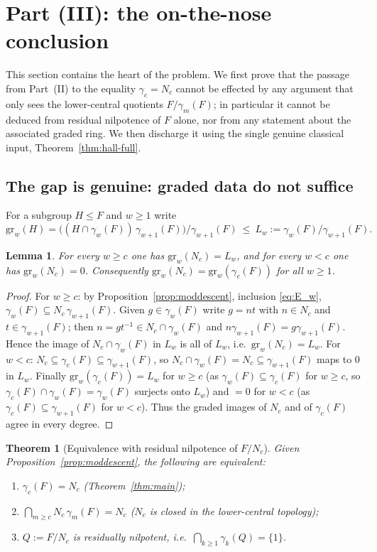 \documentclass{amsart}
\newtheorem{theorem}{Theorem}
\newtheorem{lemma}{Lemma}
\theoremstyle{definition}
\theoremstyle{remark}
\begin{document}
\section{Part (III): the on-the-nose conclusion}\label{sec:final}

This section contains the heart of the problem. We first prove that the passage
from Part~(II) to the equality $\gamma_c=N_c$ cannot be effected by any argument
that only sees the lower-central quotients $F/\gamma_m(F)$; in particular it cannot
be deduced from residual nilpotence of $F$ alone, nor from any statement about the
associated graded ring. We then discharge it using the single genuine classical
input, Theorem~\ref{thm:hall-full}.

\subsection{The gap is genuine: graded data do not suffice}

For a subgroup $H\le F$ and $w\ge1$ write
\[
\mathrm{gr}_w(H)=\big((H\cap\gamma_w(F))\,\gamma_{w+1}(F)\big)/\gamma_{w+1}(F)
\ \le\ L_w:=\gamma_w(F)/\gamma_{w+1}(F).
\]

\begin{lemma}\label{lem:gradedNc}
For every $w\ge c$ one has $\mathrm{gr}_w(N_c)=L_w$, and for every $w<c$ one has
$\mathrm{gr}_w(N_c)=0$. Consequently $\mathrm{gr}_w(N_c)=\mathrm{gr}_w(\gamma_c(F))$ for all
$w\ge1$.
\end{lemma}

\begin{proof}
For $w\ge c$: by Proposition~\ref{prop:moddescent}, inclusion \eqref{eq:E_w},
$\gamma_w(F)\subseteq N_c\,\gamma_{w+1}(F)$. Given $g\in\gamma_w(F)$ write
$g=n t$ with $n\in N_c$ and $t\in\gamma_{w+1}(F)$; then
$n=g t^{-1}\in N_c\cap\gamma_w(F)$ and $n\gamma_{w+1}(F)=g\gamma_{w+1}(F)$.
Hence the image of $N_c\cap\gamma_w(F)$ in $L_w$ is all of $L_w$, i.e.\
$\mathrm{gr}_w(N_c)=L_w$.
For $w<c$: $N_c\subseteq\gamma_c(F)\subseteq\gamma_{w+1}(F)$, so
$N_c\cap\gamma_w(F)=N_c\subseteq\gamma_{w+1}(F)$ maps to $0$ in $L_w$.
Finally $\mathrm{gr}_w(\gamma_c(F))=L_w$ for $w\ge c$ (as $\gamma_w(F)\subseteq\gamma_c(F)$
for $w\ge c$, so $\gamma_c(F)\cap\gamma_w(F)=\gamma_w(F)$ surjects onto $L_w$) and
$=0$ for $w<c$ (as $\gamma_c(F)\subseteq\gamma_{w+1}(F)$ for $w<c$). Thus the
graded images of $N_c$ and of $\gamma_c(F)$ agree in every degree.
\end{proof}

\begin{theorem}[Equivalence with residual nilpotence of $F/N_c$]\label{thm:equiv}
Given Proposition~\ref{prop:moddescent}, the following are equivalent:
\begin{enumerate}
\item[(a)] $\gamma_c(F)=N_c$ \emph{(Theorem~\ref{thm:main})};
\item[(b)] $\bigcap_{m\ge c} N_c\,\gamma_m(F)=N_c$ \emph{($N_c$ is closed in the
lower-central topology)};
\item[(c)] $Q:=F/N_c$ is residually nilpotent, i.e.\ $\bigcap_{k\ge1}\gamma_k(Q)=\{1\}$.
\end{enumerate}
\end{theorem}
\end{document}
